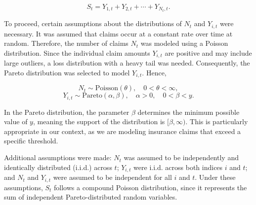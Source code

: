\documentclass{Class/julia}
\begin{document}
\[
S_t = Y_{1,t} + Y_{2,t} + \cdots + Y_{N_t,t}.
\]

To proceed, certain assumptions about the distributions of \( N_t \) and \( Y_{i,t} \) were necessary. It was assumed that claims occur at a constant rate over time at random. Therefore, the number of claims \( N_t \) was modeled using a Poisson distribution. Since the individual claim amounts \( Y_{i,t} \) are positive and may include large outliers, a loss distribution with a heavy tail was needed. Consequently, the Pareto distribution was selected to model \( Y_{i,t} \). Hence,

\[
N_t \sim \text{Poisson}(\theta), \quad 0 < \theta < \infty,
\]
\[
Y_{i,t} \sim \text{Pareto}(\alpha, \beta), \quad \alpha > 0, \quad 0 < \beta < y.
\]

In the Pareto distribution, the parameter \( \beta \) determines the minimum possible value of \( y \), meaning the support of the distribution is \( [\beta, \infty) \). This is particularly appropriate in our context, as we are modeling insurance claims that exceed a specific threshold.

Additional assumptions were made: \( N_t \) was assumed to be independently and identically distributed (i.i.d.) across \( t \); \( Y_{i,t} \) were i.i.d. across both indices \( i \) and \( t \); and \( N_t \) and \( Y_{i,t} \) were assumed to be independent for all \( i \) and \( t \). Under these assumptions, \( S_t \) follows a compound Poisson distribution, since it represents the sum of independent Pareto-distributed random variables.
\end{document}
